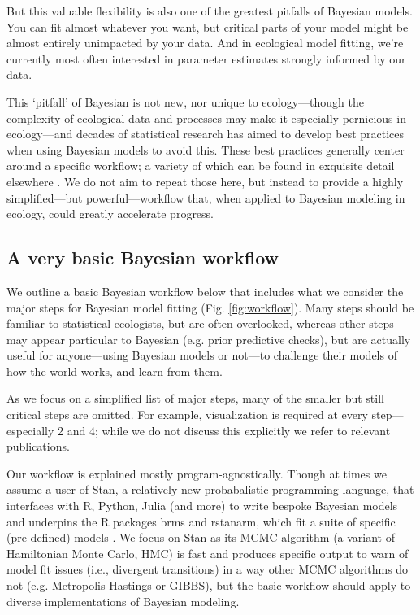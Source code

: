 \documentclass[11pt]{article}
\begin{document}
But this valuable flexibility is also one of the greatest pitfalls of Bayesian models. You can fit almost whatever you want, but critical parts of your model might be almost entirely unimpacted by your data. And in ecological model fitting, we're currently most often interested in parameter estimates strongly informed by our data. 

This `pitfall' of Bayesian is not new, nor unique to ecology---though the complexity of ecological data and processes may make it especially pernicious in ecology---and decades of statistical research has aimed to develop best practices when using Bayesian models to avoid this. These best practices generally center around a specific workflow; a variety of which can be found in exquisite detail elsewhere \citep{betanworkflow,grinsztajn2021,vandeschoot2021}. We do not aim to repeat those here, but instead to provide a highly simplified---but powerful---workflow that, when applied to Bayesian modeling in ecology, could greatly accelerate progress. %

\subsection{A very basic Bayesian workflow}

We outline a basic Bayesian workflow below that includes what we consider the major steps for Bayesian model fitting (Fig. \ref{fig:workflow}). Many steps should be familiar to statistical ecologists, but are often overlooked, whereas other steps may appear particular to Bayesian (e.g. prior predictive checks), but are actually useful for anyone---using Bayesian models or not---to challenge their models of how the world works, and learn from them. 

As we focus on a simplified list of major steps, many of the smaller but still critical steps are omitted. For example, visualization is required at every step---especially 2 and 4; while we do not discuss this explicitly we refer to relevant publications.

Our workflow is explained mostly program-agnostically. Though at times we assume a user of \textsf{Stan}, a relatively new probabalistic programming language, that interfaces with \textsf{R, Python, Julia} (and more) to write bespoke Bayesian models and underpins the \textsf{R} packages \textsf{brms} and \textsf{rstanarm}, which fit a suite of specific (pre-defined) models \citep{Carpenter:2017stan}. We focus on \textsf{Stan} as its MCMC algorithm (a variant of Hamiltonian Monte Carlo, HMC) is fast and produces specific output to warn of model fit issues (i.e., divergent transitions) in a way other MCMC algorithms do not (e.g. Metropolis-Hastings or GIBBS), but the basic workflow should apply to diverse implementations of Bayesian modeling. \\
\end{document}
